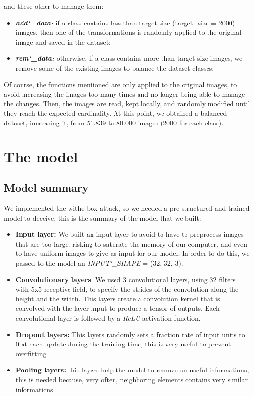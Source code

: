 and these other to manage them:
\begin{itemize}
	\item \textbf{\textit{add\char`_data:}} if a class contains less than target size (target\_size = 2000) images, then one of the transformations is randomly applied to the original image and saved in the dataset;
	\item \textbf{\textit{rem\char`_data:}} otherwise, if a class contains more than target size images, we remove some of the existing images to balance the dataset classes;
\end{itemize}

Of course, the functions mentioned are only applied to the original images, to avoid increasing the images too many times and no longer being able to manage the changes. Then, the images are read, kept locally, and randomly modified until they reach the expected cardinality.
\newline
At this point, we obtained a balanced dataset, increasing it, from 51.839 to 80.000 images (2000 for each class). 

\section{The model}

\subsection{Model summary}
We implemented the withe box attack, so we needed a pre-structured and trained model to deceive, this is the summary of the model that we built:


\begin{itemize}
	\item \textbf{Input layer:} We built an input layer to avoid to have to preprocess images that are too large, risking to saturate the memory of our computer, and even to have uniform images to give as input for our model. In order to do this, we passed to the model an \textit{INPUT\char`_SHAPE} = (32, 32, 3).
\newline
	\item \textbf{Convolutionary layers:} We used 3 convolutional layers, using 32 filters with 5x5 receptive field, to specify the strides of the convolution along the height and the width. This layers create a convolution kernel that is convolved with the layer input to produce a tensor of outputs. Each convolutional layer is followed by a \textit{ReLU} activation function.
\newline
	\item \textbf{Dropout layers:} This layers randomly sets a fraction rate of input units to 0 at each update during the training time, this is very useful to prevent overfitting. 
\newline
	\item \textbf{Pooling layers:} this layers help the model to remove un-useful informations, this is needed because, very often, neighboring elements contains very similar informations.
\end{itemize}


